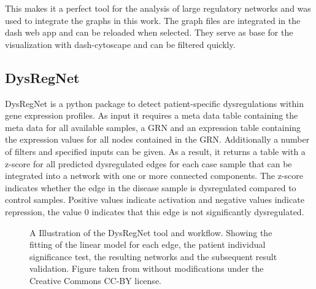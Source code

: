 \documentclass[pdftex,12pt,a4paper]{report}
\begin{document}
This makes it a perfect tool for the analysis of large regulatory networks and was used to integrate the graphs in this work. The graph files are integrated in the dash web app and can be reloaded when selected. They serve as base for the visualization with dash-cytoscape and can be filtered quickly.


\subsection{DysRegNet}

DysRegNet\cite{dysregnet} is a python package to detect patient-specific dysregulations within gene expression profiles. 
As input it requires a meta data table containing the meta data for all available samples, a GRN and an expression table containing the expression values for all nodes contained in the GRN. Additionally a number of filters and specified inputs can be given. 
As a result, it returns a table with a z-score for all predicted dysregulated edges for each case sample that can be integrated into a network with one or more connected components. The z-score indicates whether the edge in the disease sample is dysregulated compared to control samples. Positive values indicate activation and negative values indicate repression, the value 0 indicates that this edge is not significantly dysregulated. 
\begin{figure}[!ht]
\begin{center}
	\caption{A Illustration of the DysRegNet tool and workflow. Showing the fitting of the linear model for each edge, the patient individual significance test, the resulting networks and the subsequent result validation. Figure taken from \cite{dysregnet} without modifications under the Creative Commons CC-BY license.}
	\label{dysregnet}
\end{center}
\end{figure}
\end{document}
